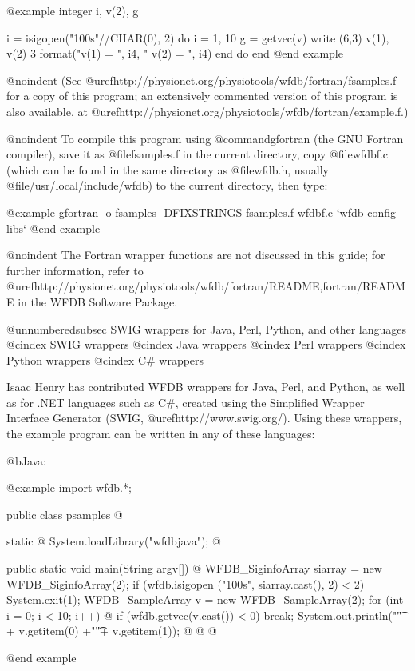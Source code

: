 {@example
        integer i, v(2), g

        i = isigopen("100s"//CHAR(0), 2)
        do i = 1, 10
         g = getvec(v)
         write (6,3) v(1), v(2)
 3      format("v(1) = ", i4, "    v(2) = ", i4)
        end do
        end
@end example

@noindent
(See @uref{http://physionet.org/physiotools/wfdb/fortran/fsamples.f}
for a copy of this program;  an extensively commented version of this program
is also available, at
@uref{http://physionet.org/physiotools/wfdb/fortran/example.f}.)

@noindent
To compile this program using @command{gfortran} (the GNU Fortran compiler),
save it as @file{fsamples.f} in the current directory, copy @file{wfdbf.c}
(which can be found in the same directory as @file{wfdb.h}, usually
@file{/usr/local/include/wfdb}) to the current directory, then type:

@example
gfortran -o fsamples -DFIXSTRINGS fsamples.f wfdbf.c `wfdb-config --libs`
@end example

@noindent
The Fortran wrapper functions are not discussed in this guide; for further
information, refer to
@uref{http://physionet.org/physiotools/wfdb/fortran/README,fortran/README}
in the WFDB Software Package.

@unnumberedsubsec SWIG wrappers for Java, Perl, Python, and other languages
@cindex SWIG wrappers
@cindex Java wrappers
@cindex Perl wrappers
@cindex Python wrappers
@cindex C# wrappers

Isaac Henry has contributed WFDB wrappers for Java, Perl, and Python,
as well as for .NET languages such as C#, created using the Simplified
Wrapper Interface Generator (SWIG, @uref{http://www.swig.org/}).  Using
these wrappers, the example program can be written in any of these languages:

@b{Java:}

@example
import wfdb.*;

public class psamples @{
    static @{
        System.loadLibrary("wfdbjava");
    @}

    public static void main(String argv[]) @{
        WFDB_SiginfoArray siarray = new WFDB_SiginfoArray(2);
        if (wfdb.isigopen ("100s", siarray.cast(), 2) < 2)
            System.exit(1);
        WFDB_SampleArray v = new WFDB_SampleArray(2);
        for (int i = 0; i < 10; i++) @{
            if (wfdb.getvec(v.cast()) < 0)
                break;
            System.out.println("\t" + v.getitem(0) +"\t"+ v.getitem(1));
        @}
    @}
@}
@end example

}
